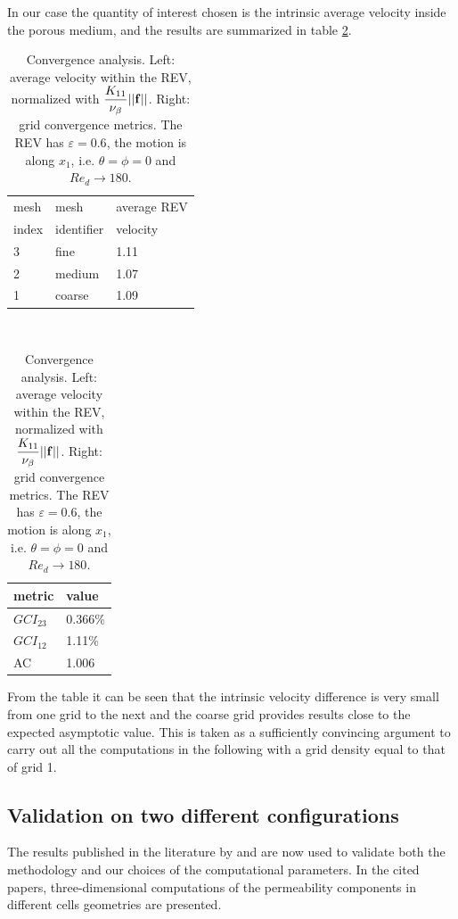 \noindent In our case the quantity of interest chosen is the intrinsic average velocity inside the porous medium, and the results are summarized in table \ref{table:convergence}.
\begin{table}[t]
	\begin{center}
		\begin{tabular}{ l  |l   l   }
			mesh   &	mesh   & average REV  \\
			index  &	identifier  &  velocity \\ 
			\hline \hline
			3 &	fine & 1.11  \\ 
			2 &	medium & 1.07  \\ 
			1 & coarse & 1.09  \\ 
			\hline
		\end{tabular}
		$\qquad$
		\begin{tabular}{ l | l } %
			metric & value \\ \hline \hline
			${GCI}_{23}$ & 0.366\%  \\ 
			${GCI}_{12}$ & 1.11\%  \\ 
			AC & 1.006  \\
			\hline
		\end{tabular}
		\caption{Convergence analysis. Left: average velocity within the REV, normalized with $\displaystyle{\frac{K_{11}}{\nu_{\beta}} ||\bf{f}||}$. 
			Right: grid convergence metrics. The REV has $\varepsilon=0.6$, the motion is along $x_1$, i.e. 
			$\theta=\phi=0$ and $Re_d \rightarrow 180$.}
		\label{table:convergence}
	\end{center}
\end{table}
From the table it can be seen that the intrinsic velocity difference is very small from one grid to the next and the coarse grid provides results close to the expected asymptotic value. This is taken as a sufficiently convincing argument to carry out all the computations in the following with a grid density equal to that of grid 1. 



\subsection{Validation on two different configurations}

The results published in the literature by \citet{zampogna2016fluid} and \citet{yazdchi2011} are now used to validate both the methodology and our choices of the computational parameters. In the cited papers, three-dimensional  computations of the permeability components in different cells geometries are presented.

